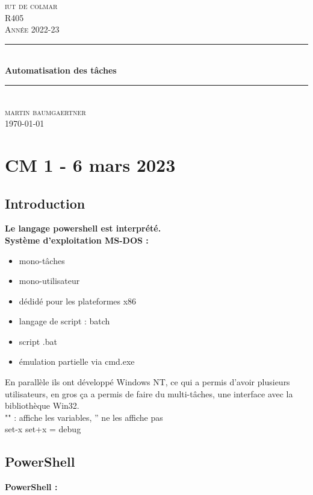 \documentclass[12pt, a4paper]{article}
\begin{document}
\begin{titlepage}
	\newcommand{\HRule}{\rule{\linewidth}{0.5mm}} 
	\center 
	\textsc{\LARGE iut de colmar}\\[6.5cm] 
	\textsc{\Large R405}\\[0.5cm] 
	\textsc{\large Année 2022-23}\\[0.5cm]
	\HRule\\[0.75cm]
	{\huge\bfseries Automatisation des tâches}\\[0.4cm]
	\HRule\\[1.5cm]
	\textsc{\large martin baumgaertner}\\[6.5cm] 

	\vfill\vfill\vfill
	{\large\today} 
	\vfill
\end{titlepage}
\newpage
\tableofcontents
\newpage
\section{CM 1 - 6 mars 2023}
\subsection{Introduction}
\textbf{Le langage powershell est interprété.}\\

\textbf{Système d'exploitation MS-DOS :}\\

    \begin{itemize}
        \item mono-tâches
        \item mono-utilisateur
        \item dédidé pour les plateformes x86
        \item langage de script : batch
        \item script .bat 
        \item émulation partielle via cmd.exe\\
    \end{itemize}

En parallèle ils ont développé Windows NT, ce qui a permis d'avoir plusieurs utilisateurs, 
en gros ça a permis de faire du multi-tâches, une interface avec la bibliothèque Win32.\\

"" : affiche les variables, '' ne les affiche pas\\
set-x set+x = debug 

\subsection{PowerShell}
\textbf{PowerShell :}\\
\end{document}
